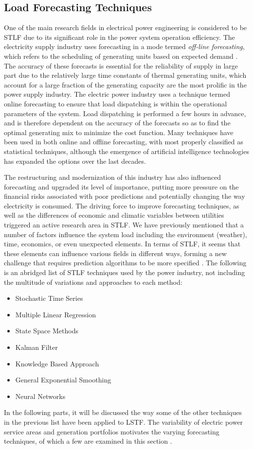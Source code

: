 \subsection{Load Forecasting Techniques}
One of the main research fields in electrical power engineering is considered to be STLF due to its significant role in the power system operation efficiency. The electricity supply industry uses forecasting in a mode termed \textit{off-line forecasting}, which refers to the scheduling of generating units based on expected demand \cite{amjady2001short,soliman2010electrical}. The accuracy of these forecasts is essential for the reliability of supply in large part due to the relatively large time constants of thermal generating units, which account for a large fraction of the generating capacity are the most prolific in the power supply industry. The electric power industry uses a technique termed online forecasting to ensure that load dispatching is within the operational parameters of the system. Load dispatching is performed a few hours in advance, and is therefore dependent on the accuracy of the forecasts so as to find the optimal generating mix to minimize the cost function. Many techniques have been used in both online and offline forecasting, with most properly classified as statistical techniques, although the emergence of artificial intelligence technologies has expanded the options over the last decades. 
\par The restructuring and modernization of this industry has also influenced forecasting and upgraded its level of importance, putting more pressure on the financial risks associated with poor predictions and potentially changing the way electricity is consumed. The driving force to improve forecasting techniques, as well as the differences of economic and climatic variables between utilities triggered an active research area in STLF. We have previously mentioned that a number of factors influence the system load including the environment (weather), time, economics, or even unexpected elements. In terms of STLF, it seems that these elements can influence various fields in different ways, forming a new challenge that requires prediction algorithms to be more specified \cite{chatfield2000time}. The following is an abridged list of STLF techniques used by the power industry, not including the multitude of variations and approaches to each method:
\begin{itemize}
\item Stochastic Time Series
\item Multiple Linear Regression
\item State Space Methods
\item Kalman Filter
\item Knowledge Based Approach
\item General Exponential Smoothing
\item Neural Networks
\end{itemize}
\par In the following parts, it will be discussed the way some of the other techniques in the previous list have been applied to LSTF. The variability of electric power service areas and generation portfolios motivates the varying forecasting techniques, of which a few are examined in this section \cite{zor2017state}. 
